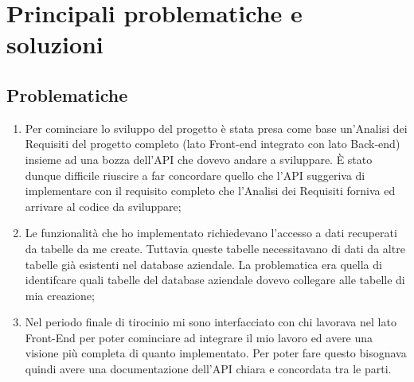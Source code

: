 \section{Principali problematiche e soluzioni}
\subsection*{Problematiche}
\begin{enumerate}
\item Per cominciare lo sviluppo del progetto è stata presa come base un’Analisi dei Requisiti del progetto completo (lato Front-end integrato con lato Back-end) insieme ad una bozza dell'API che dovevo andare a sviluppare. È stato dunque difficile riuscire a far concordare quello che l’API suggeriva di implementare con il requisito completo che l’Analisi dei Requisiti forniva ed arrivare al codice da sviluppare;
\item Le funzionalità che ho implementato richiedevano l'accesso a dati recuperati da tabelle da me create. Tuttavia queste tabelle necessitavano di dati da altre tabelle già esistenti nel database aziendale. La problematica era quella di identifcare quali tabelle del database aziendale dovevo collegare alle tabelle di mia creazione; 
\item Nel periodo finale di tirocinio mi sono interfacciato con chi lavorava nel lato Front-End per poter cominciare ad integrare il mio lavoro ed avere una visione più completa di quanto implementato. Per poter fare questo bisognava quindi avere una documentazione dell’API chiara e concordata tra le parti.
\end{enumerate}

